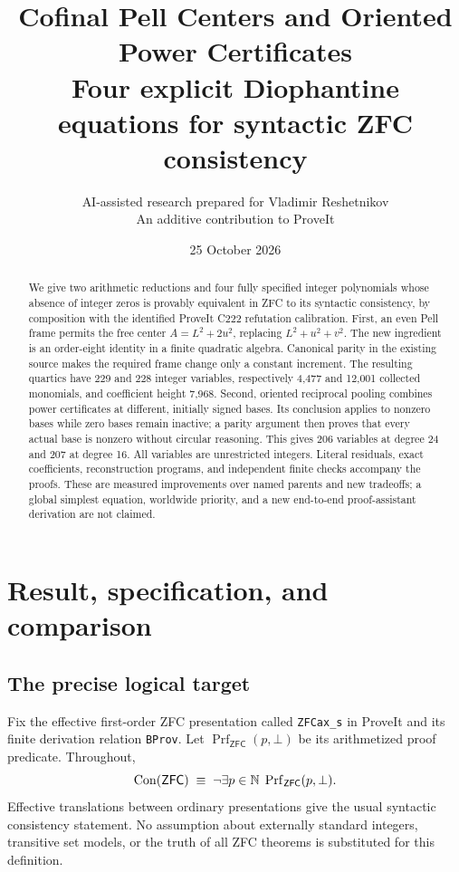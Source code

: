\documentclass[10pt,letterpaper]{article}
\title{\textbf{Cofinal Pell Centers and Oriented Power Certificates}\\[4pt]
\large Four explicit Diophantine equations for syntactic ZFC consistency}
\author{AI-assisted research prepared for Vladimir Reshetnikov\\
\small An additive contribution to ProveIt}
\date{25 October 2026}
\theoremstyle{definition}\newtheorem{definition}[theorem]{Definition}
\theoremstyle{remark}\newtheorem{remark}[theorem]{Remark}
\newcommand{\Con}{\operatorname{Con}}\newcommand{\ZFC}{\mathsf{ZFC}}
\newcommand{\Prf}{\operatorname{Prf}}
\begin{document}
\maketitle
\begin{abstract}
We give two arithmetic reductions and four fully specified integer
polynomials whose absence of integer zeros is provably equivalent in ZFC
to its syntactic consistency, by composition with the identified ProveIt
C222 refutation calibration. First, an even Pell frame permits the free
center $A=L^2+2u^2$, replacing $L^2+u^2+v^2$. The new ingredient is an
order-eight identity in a finite quadratic algebra. Canonical parity in
the existing source makes the required frame change only a constant
increment. The resulting quartics have 229 and 228 integer variables,
respectively 4,477 and 12,001 collected monomials, and coefficient height
7,968. Second, oriented reciprocal pooling combines power certificates
at different, initially signed bases. Its conclusion applies to nonzero
bases while zero bases remain inactive; a parity argument then proves
that every actual base is nonzero without circular reasoning. This gives
206 variables at degree 24 and 207 at degree 16. All variables are
unrestricted integers. Literal residuals, exact coefficients,
reconstruction programs, and independent finite checks accompany the
proofs. These are measured improvements over named parents and new
tradeoffs; a global simplest equation, worldwide priority, and a new
end-to-end proof-assistant derivation are not claimed.
\end{abstract}
\setcounter{tocdepth}{1}
\tableofcontents
\newpage

\section{Result, specification, and comparison}

\subsection{The precise logical target}

Fix the effective first-order ZFC presentation called
\texttt{ZFCax\_s} in ProveIt and its finite derivation relation
\texttt{BProv}. Let $\Prf_{\ZFC}(p,\bot)$ be its arithmetized proof
predicate. Throughout,
\[
 \Con(\ZFC)\;\equiv\;\neg\exists p\in\N\;\Prf_{\ZFC}(p,\bot).
\]
Effective translations between ordinary presentations give the usual
syntactic consistency statement. No assumption about externally standard
integers, transitive set models, or the truth of all ZFC theorems is
substituted for this definition.
\end{document}
